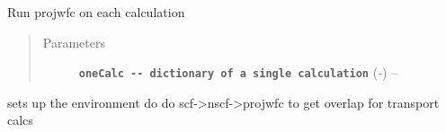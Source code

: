 \documentclass[letterpaper,10pt,english]{sphinxmanual}
\begin{document}

\begin{fulllineitems}
\label{scfuj:scfuj.projwfc}
Run projwfc on each calculation
\begin{quote}\begin{description}
\item[{Parameters}] \leavevmode
\textbf{\texttt{oneCalc -{-} dictionary of a single calculation}} (\emph{-}) -- 

\end{description}\end{quote}

\end{fulllineitems}


\begin{fulllineitems}
\label{scfuj:scfuj.run}
\end{fulllineitems}


\begin{fulllineitems}
\label{scfuj:scfuj.run_transport}
\end{fulllineitems}


\begin{fulllineitems}
\label{scfuj:scfuj.scfprep}
\end{fulllineitems}


\begin{fulllineitems}
\label{scfuj:scfuj.transport_prep}
sets up the environment do do scf-\textgreater{}nscf-\textgreater{}projwfc to get overlap for transport calcs

\end{fulllineitems}
\end{document}
